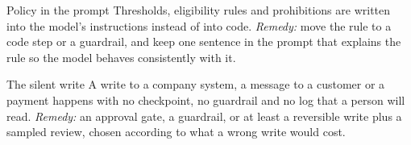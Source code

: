 \begin{antipattern}{Policy in the prompt}
Thresholds, eligibility rules and prohibitions are written into the model's instructions instead of into code. \emph{Remedy:} move the rule to a code step or a guardrail, and keep one sentence in the prompt that explains the rule so the model behaves consistently with it.
\end{antipattern}

\begin{antipattern}{The silent write}
A write to a company system, a message to a customer or a payment happens with no checkpoint, no guardrail and no log that a person will read. \emph{Remedy:} an approval gate, a guardrail, or at least a reversible write plus a sampled review, chosen according to what a wrong write would cost.
\end{antipattern}
